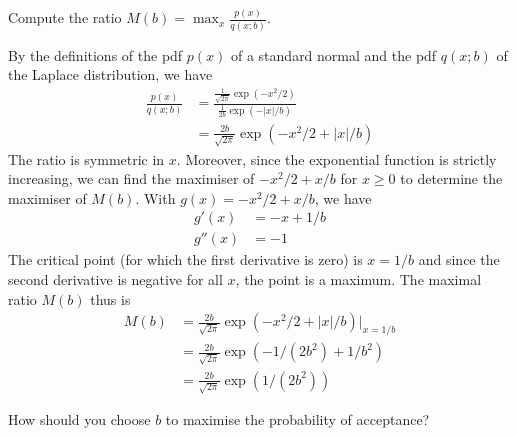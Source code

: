 \begin{exenumerate}
\item Compute the ratio $M(b) = \max_x \frac{p(x)}{q(x; b)}$.
  \begin{solution}
    By the definitions of the pdf $p(x)$ of a standard normal and the pdf $q(x; b)$ of the Laplace distribution, we have
    \begin{align}
      \frac{p(x)}{q(x;b)} &= \frac{ \frac{1}{\sqrt{2\pi}} \exp(-x^2/2)}{\frac{1}{2b}\exp(-|x|/b)}\\
          & = \frac{2b}{\sqrt{2\pi}} \exp(-x^2/2 + |x|/b)
    \end{align}
    The ratio is symmetric in $x$. Moreover, since the exponential
    function is strictly increasing, we can find the maximiser of
    $-x^2/2+x/b$ for $x\ge 0$ to determine the maximiser of
    $M(b)$. With $g(x) = -x^2/2+x/b$, we have
    \begin{align}
      g'(x) &= -x + 1/b\\
      g''(x) &= -1
    \end{align}
    The critical point (for which the first derivative is zero) is $x = 1/b$ and since the second derivative is negative for all $x$, the point is a maximum. The maximal ratio $M(b)$ thus is
    \begin{align}
      M(b)  & = \frac{2b}{\sqrt{2\pi}} \exp\left(-x^2/2 + |x|/b\right)\Big|_{x=1/b}\\
      & = \frac{2b}{\sqrt{2\pi}} \exp\left(-1/(2b^2) + 1/b^2\right)\\
      & = \frac{2b}{\sqrt{2\pi}} \exp\left(1/(2b^2)\right)
    \end{align}
  \end{solution}

\item How should you choose $b$ to maximise the probability of acceptance?


\end{exenumerate}

